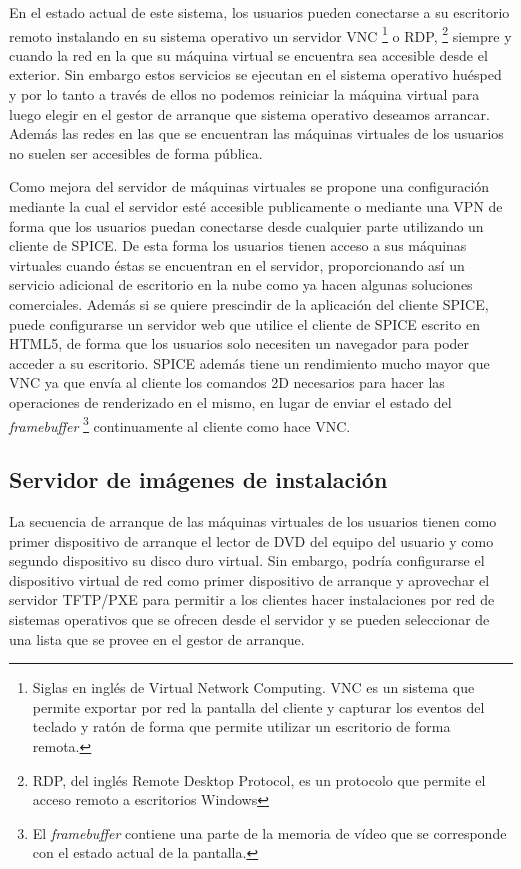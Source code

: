 \documentclass[spanisheDIVcalc,twoside,parskip-,pointlessnumbers,final]{scrbook}
\begin{document}
En el estado actual de este sistema, los usuarios pueden conectarse
a su escritorio remoto instalando en su sistema operativo un servidor
VNC%
\footnote{Siglas en inglés de Virtual Network Computing. VNC es un sistema que
permite exportar por red la pantalla del cliente y capturar los eventos
del teclado y ratón de forma que permite utilizar un escritorio de
forma remota.%
} o RDP,%
\footnote{RDP, del inglés Remote Desktop Protocol, es un protocolo que permite
el acceso remoto a escritorios Windows%
} siempre y cuando la red en la que su máquina virtual se encuentra
sea accesible desde el exterior. Sin embargo estos servicios se ejecutan
en el sistema operativo huésped y por lo tanto a través de ellos no
podemos reiniciar la máquina virtual para luego elegir en el gestor
de arranque que sistema operativo deseamos arrancar. Además las redes
en las que se encuentran las máquinas virtuales de los usuarios no
suelen ser accesibles de forma pública.

Como mejora del servidor de máquinas virtuales se propone una configuración
mediante la cual el servidor esté accesible publicamente o mediante
una VPN de forma que los usuarios puedan conectarse desde cualquier
parte utilizando un cliente de SPICE. De esta forma los usuarios tienen
acceso a sus máquinas virtuales cuando éstas se encuentran en el servidor,
proporcionando así un servicio adicional de escritorio en la nube
como ya hacen algunas soluciones comerciales. Además si se quiere
prescindir de la aplicación del cliente SPICE, puede configurarse
un servidor web que utilice el cliente de SPICE escrito en HTML5,
de forma que los usuarios solo necesiten un navegador para poder acceder
a su escritorio. SPICE además tiene un rendimiento mucho mayor que
VNC ya que envía al cliente los comandos 2D necesarios para hacer
las operaciones de renderizado en el mismo, en lugar de enviar el
estado del \emph{framebuffer}%
\footnote{El \emph{framebuffer} contiene una parte de la memoria de vídeo que
se corresponde con el estado actual de la pantalla.%
} continuamente al cliente como hace VNC.


\subsection{Servidor de imágenes de instalación}

La secuencia de arranque de las máquinas virtuales de los usuarios
tienen como primer dispositivo de arranque el lector de DVD del equipo
del usuario y como segundo dispositivo su disco duro virtual. Sin
embargo, podría configurarse el dispositivo virtual de red como primer
dispositivo de arranque y aprovechar el servidor TFTP/PXE para permitir
a los clientes hacer instalaciones por red de sistemas operativos
que se ofrecen desde el servidor y se pueden seleccionar de una lista
que se provee en el gestor de arranque.
\end{document}
